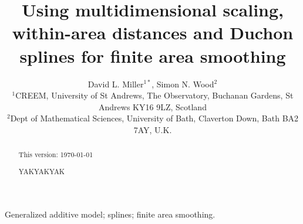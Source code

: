 \documentclass[useAMS,referee]{biom}
\title[Finite area smoothing with MDS]{Using multidimensional scaling, within-area distances and Duchon splines for finite area smoothing}
\author{David L. Miller$^{1*}$\email{dave@ninepointeightone.net}, Simon N. Wood$^{2}$\\
$^{1}$CREEM, University of St Andrews, The Observatory, Buchanan Gardens, St Andrews KY16 9LZ, Scotland\\
$^{2}$Dept of Mathematical Sciences, University of Bath, Claverton Down, Bath BA2 7AY, U.K.
}
\begin{document}








\label{firstpage}


\begin{abstract}
This version: \today %

YAKYAKYAK
\end{abstract}

%

\begin{keywords}
Generalized additive model; splines; finite area smoothing.
\end{keywords}
\end{document}
